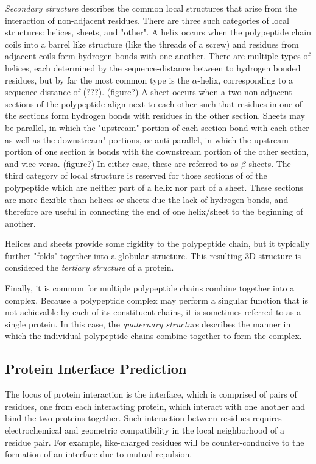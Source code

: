 \textit{Secondary structure} describes the common local structures that arise from the interaction of non-adjacent residues.
There are three such categories of local structures: helices, sheets, and "other".
A helix occurs when the polypeptide chain coils into a barrel like structure (like the threads of a screw) and residues from adjacent coils form hydrogen bonds with one another.
There are multiple types of helices, each determined by the sequence-distance between to hydrogen bonded residues, but by far the most common type is the $\alpha$-helix, corresponding to a sequence distance of (???). (figure?)
A sheet occurs when a two non-adjacent sections of the polypeptide align next to each other such that residues in one of the sections form hydrogen bonds with residues in the other section.
Sheets may be parallel, in which the "upstream" portion of each section bond with each other as well as the downstream" portions, or anti-parallel, in which the upstream portion of one section is bonds with the downstream portion of the other section, and vice versa. (figure?)
In either case, these are referred to as $\beta$-sheets. 
The third category of local structure is reserved for those sections of of the polypeptide which are neither part of a helix nor part of a sheet.
These sections are more flexible than helices or sheets due the lack of hydrogen bonds, and therefore are useful in connecting the end of one helix/sheet to the beginning of another. 

Helices and sheets provide some rigidity to the polypeptide chain, but it typically further "folds" together into a globular structure. This resulting 3D structure is considered the \textit{tertiary structure} of a protein. 

Finally, it is common for multiple polypeptide chains combine together into a complex.
Because a polypeptide complex may perform a singular function that is not achievable by each of its constituent chains, it is sometimes referred to as a single protein. 
In this case, the \textit{quaternary structure} describes the manner in which the individual polypeptide chains combine together to form the complex. 



\subsection{Protein Interface Prediction}

The locus of protein interaction is the interface, which is comprised of pairs of residues, one from each interacting protein, which interact with one another and bind the two proteins together.
Such interaction between residues requires electrochemical and geometric compatibility in the local neighborhood of a residue pair.
For example, like-charged residues will be counter-conducive to the formation of an interface due to mutual repulsion.

